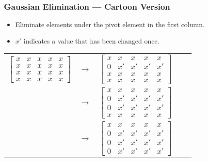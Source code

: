 \documentclass[10pt]{beamer}
\begin{document}
\begin{frame}[shrink]
\frametitle{Gaussian Elimination --- Cartoon Version}
\begin{itemize}
    \item Eliminate elements under the pivot element in the first column.
    \item $x'$ indicates a value that has been changed once.
\end{itemize}
\begin{center}
	\renewcommand{\arraystretch}{1.3}
	\footnotesize
	\begin{tabular}{ccccc}
		$\begin{bmatrix}\boxed{x} & x & x & x & x \\
						   x  & x  & x  & x  & x  \\
						   x  & x  & x  & x  & x \\
						   x  & x  & x  & x  & x \end{bmatrix}$
		& $\longrightarrow$ &
		$\begin{bmatrix}\boxed{x} & x & x & x & x \\
						   0  & x' & x' & x' & x' \\
						   x  & x  & x  & x  & x \\
						   x  & x  & x  & x  & x \end{bmatrix}$ \\[55pt]
		& $\longrightarrow$ &
		$\begin{bmatrix}\boxed{x} & x & x & x & x \\
						   0  & x' & x' & x' & x' \\
						   0  & x' & x' & x' & x' \\
						   x  & x  & x  & x  & x \end{bmatrix}$ \\[55pt]
		& $\longrightarrow$ &
		$\begin{bmatrix}\boxed{x} & x & x & x & x \\
						   0  & x' & x' & x' & x' \\
						   0  & x' & x' & x' & x' \\
						   0  & x' & x' & x' & x'\end{bmatrix}$ &
	\end{tabular}
\end{center}

\end{frame}
\end{document}

